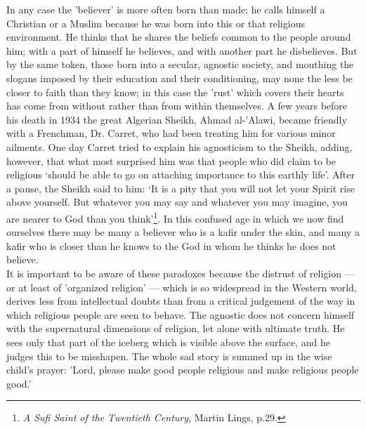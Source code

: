 \documentclass[10pt, twoside]{book}
\begin{document}
In any case the 'believer' is more often born than made; he calls himself a Christian or a Muslim 
because he was born into this or that religious environment. He thinks that he shares the beliefs 
common to the people around him; with a part of himself he believes, and with another part he 
disbelieves. But by the same token, those born into a secular, agnostic society, and mouthing the 
slogans imposed by their education and their conditioning, may none the less be closer to faith than 
they know; in this case the 'rust' which covers their hearts has come from without rather than from 
within themselves. A few years before his death in 1934 the great Algerian Sheikh, Ahmad al\hyp{}'Alawi, 
became friendly with a Frenchman, Dr. Carret, who had been treating him for various minor ailments. 
One day Carret tried to explain his agnosticism to the Sheikh, adding, however, that what most 
surprised him was that people who did claim to be religious `should be able to go on attaching 
importance to this earthly life'. After a pause, the Sheikh said to him: `It is a pity that you will 
not let your Spirit rise above yourself. But whatever you may say and whatever you may imagine, you 
are nearer to God than you think'\footnote{\emph{A Sufi Saint of the Twentieth Century}, Martin Lings, p.29.}. In this confused age in which we now find ourselves there may be many a believer who is a kafir under the skin, and many a kafir who is closer than he knows to the God in whom he thinks he does not believe. \\

It is important to be aware of these paradoxes because the distrust of religion --- or at least of 
'organized religion' --- which is so widespread in the Western world, derives less from intellectual 
doubts than from a critical judgement of the way in which religious people are seen to behave. The 
agnostic does not concern himself with the supernatural dimensions of religion, let alone with 
ultimate truth. He sees only that part of the iceberg which is visible above the surface, and he 
judges this to be misshapen. The whole sad story is summed up in the wise child's prayer: 'Lord, 
please make good people religious and make religious people good.' \\
\end{document}
